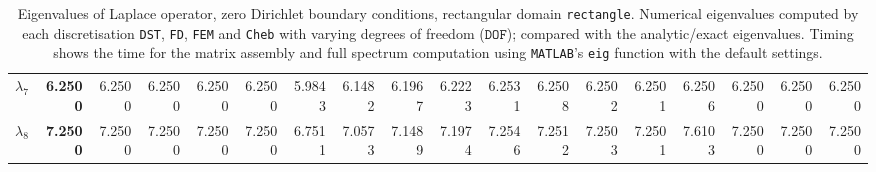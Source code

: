 \begin{table}[htbp]
{{\begin{tabular}{lrrrrrrrrrrrrrrrrr}
    $\lambda_{7}$ & \textbf{6.2500} & 6.2500 & 6.2500 & 6.2500 & 6.2500 & 5.9843 & 6.1482 & 6.1967 & 6.2223 & 6.2531 & 6.2508 & 6.2502 & 6.2501 & 6.2506 & 6.2500 & 6.2500 & 6.2500 \\
    $\lambda_{8}$ & \textbf{7.2500} & 7.2500 & 7.2500 & 7.2500 & 7.2500 & 6.7511 & 7.0573 & 7.1489 & 7.1974 & 7.2546 & 7.2512 & 7.2503 & 7.2501 & 7.6103 & 7.2500 & 7.2500 & 7.2500 \\
    \bottomrule
  \end{tabular}}}
  \caption{Eigenvalues of Laplace operator, zero Dirichlet boundary conditions, rectangular domain \texttt{rectangle}. Numerical eigenvalues computed by each discretisation \texttt{DST}, \texttt{FD}, \texttt{FEM} and \texttt{Cheb} with varying degrees of freedom ($\mathtt{DOF}$); compared with the analytic/exact eigenvalues. Timing shows the time for the matrix assembly and full spectrum computation using \texttt{MATLAB}'s \lstinline{eig} function with the default settings.}
  \label{tab:eigenvalues_head_rectangle_transposed}
\end{table}
